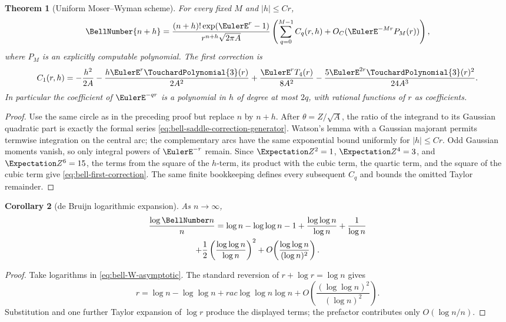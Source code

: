 \documentclass[11pt,a4paper,oneside,openany]{book}
\newtheorem{theorem}{Theorem}[chapter]
\newtheorem{corollary}[theorem]{Corollary}
\theoremstyle{definition}
\theoremstyle{remark}
\begin{document}
\begin{theorem}[Uniform Moser--Wyman scheme]\label{thm:bell-refined-saddle}
For every fixed $M$ and $|h|\le Cr$,
\begin{equation}\label{eq:bell-refined-saddle}
 \BellNumber{n+h}=\frac{(n+h)!\exp(\EulerE^r-1)}{r^{n+h}\sqrt{2\pi A}}
 \left(\sum_{q=0}^{M-1}C_q(r,h)+O_C(\EulerE^{-Mr}P_M(r))\right),
\end{equation}
where $P_M$ is an explicitly computable polynomial.  The first correction is
\begin{equation}\label{eq:bell-first-correction}
 C_1(r,h)=
 -\frac{h^2}{2A}-\frac{h \EulerE^r\TouchardPolynomial{3}(r)}{2A^2}
 +\frac{\EulerE^rT_4(r)}{8A^2}
 -\frac{5\EulerE^{2r}\TouchardPolynomial{3}(r)^2}{24A^3}.
\end{equation}
In particular the coefficient of $\EulerE^{-qr}$ is a polynomial in $h$ of degree at
most $2q$, with rational functions of $r$ as coefficients.
\end{theorem}
\begin{proof}
Use the same circle as in the preceding proof but replace $n$ by $n+h$.  After
$\theta=Z/\sqrt A$, the ratio of the integrand to its Gaussian quadratic part is
exactly the formal series \eqref{eq:bell-saddle-correction-generator}.  Watson's
lemma with a Gaussian majorant permits termwise integration on the central arc;
the complementary arcs have the same exponential bound uniformly for
$|h|\le Cr$.  Odd Gaussian moments vanish, so only integral powers of $\EulerE^{-r}$
remain.  Since $\Expectation Z^2=1$, $\Expectation Z^4=3$, and $\Expectation Z^6=15$, the terms from the square
of the $h$-term, its product with the cubic term, the quartic term, and the square
of the cubic term give \eqref{eq:bell-first-correction}.  The same finite
bookkeeping defines every subsequent $C_q$ and bounds the omitted Taylor
remainder.
\end{proof}

\begin{corollary}[de Bruijn logarithmic expansion]\label{cor:bell-debruijn}
As $n\to\infty$,
\begin{multline}\label{eq:bell-debruijn}
 \frac{\log\BellNumber n}{n}
 =\log n-\log\log n-1
 +\frac{\log\log n}{\log n}+\frac1{\log n}\\
 +\frac12\left(\frac{\log\log n}{\log n}\right)^2
 +O\!\left(\frac{\log\log n}{(\log n)^2}\right).
\end{multline}
\end{corollary}
\begin{proof}
Take logarithms in \eqref{eq:bell-W-asymptotic}.  The standard reversion of
$r+\log r=\log n$ gives
\[
 r=\log n-\log\log n+
rac{\log\log n}{\log n}
 +O\!\left(\frac{(\log\log n)^2}{(\log n)^2}\right).
\]
Substitution and one further Taylor expansion of $\log r$ produce the displayed
terms; the prefactor contributes only $O(\log n/n)$.
\end{proof}
\end{document}
